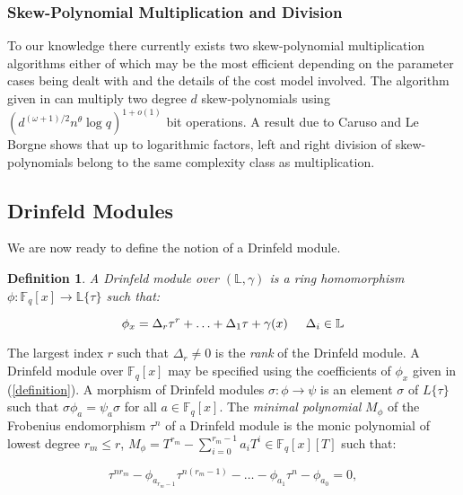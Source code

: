 \documentclass[sigconf]{acmart}
\newtheorem{definition}{Definition}
\newcommand{\F}{\mathbb{F}}
\renewcommand{\L}{\mathbb{L}}
\begin{document}
\subsubsection{Skew-Polynomial Multiplication and Division} 

To our knowledge there currently exists two skew-polynomial multiplication algorithms either of which may be the most efficient depending on the parameter cases being dealt with and the details of the cost model involved. The algorithm given in \cite{PuchingerW15} can multiply two degree $d$ skew-polynomials using $(d^{(\omega + 1)/2}n^{\theta} \log q)^{1 + o(1)}$ bit operations. A result due to Caruso and Le Borgne \cite{CaLe17} shows that up to logarithmic factors, left and right division of skew-polynomials belong to the same complexity class as multiplication.

\subsection{Drinfeld Modules}

We are now ready to define the notion of a Drinfeld module.

\begin{definition}
A \emph{Drinfeld module} over $(\L, \gamma)$ is a ring homomorphism $\phi: \F_q[x] \to \L\{ \tau \}$ such that:
\end{definition}

\begin{equation}\label{definition}
    \phi_x = \Delta_r \tau^r + \ldots + \Delta_1 \tau + \gamma(x) 
    \hspace{5mm} \Delta_i \in \L
\end{equation}

The largest index $r$ such that $\Delta_r \neq 0$ is the \textit{rank} of the Drinfeld module. A Drinfeld module over $\F_q[x]$ may be specified using the coefficients of $\phi_x$ given in (\ref{definition}). A morphism of Drinfeld modules $\sigma: \phi \to \psi$ is an element $\sigma$ of $L\{ \tau \}$ such that $\sigma \phi_a = \psi_a \sigma$ for all $a \in \F_q[x]$. The \textit{minimal polynomial} $M_{\phi}$ of the Frobenius endomorphism $\tau^n$ of a Drinfeld module is the monic polynomial of lowest degree $r_m \leq r$, $M_{\phi} = T^{r_m} - \sum_{i=0}^{r_m - 1} a_iT^i \in \F_q[x][T]$ such that:

\begin{equation}\label{characteristic}
    \tau^{n r_m} - \phi_{a_{r_m-1}}\tau^{n(r_m -1)} - \ldots - \phi_{a_1} \tau^n - \phi_{a_0} = 0, 
\end{equation}
\end{document}
